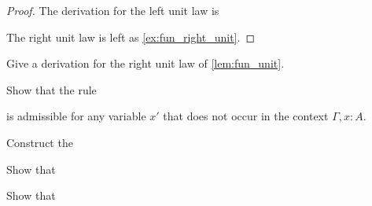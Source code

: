 \begin{proof}
The derivation for the left unit law is
\begin{prooftree}
\end{prooftree}
The right unit law is left as \cref{ex:fun_right_unit}.
\end{proof}

\begin{exercises}
\item \label{ex:fun_right_unit}Give a derivation for the right unit law of \cref{lem:fun_unit}.
\item Show that the rule
\begin{prooftree}
\end{prooftree}
is admissible for any variable $x'$ that does not occur in the context $\Gamma,x:A$.
\item 
  \begin{subexenum}
  \item Construct the 
    \begin{prooftree}
    \end{prooftree}
  \item Show that
    \begin{prooftree}
    \end{prooftree}
  \item Show that
    \begin{prooftree}
    \end{prooftree}
  \end{subexenum}

\end{exercises}

